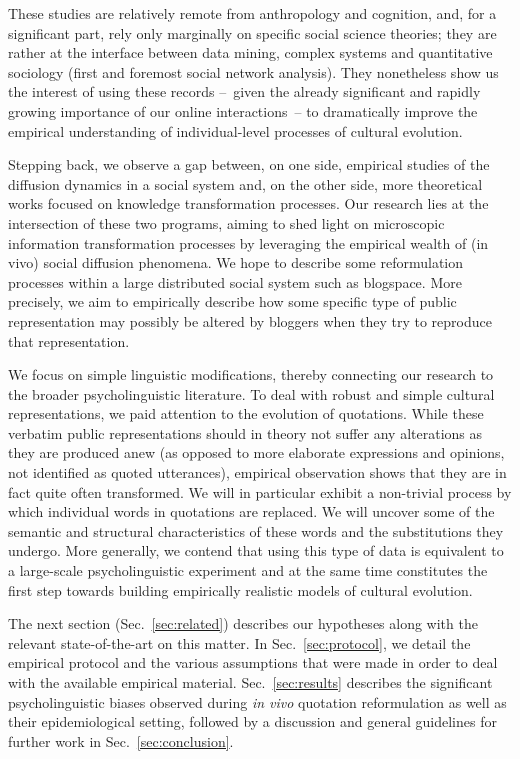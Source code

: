 These studies are relatively remote from anthropology and cognition, and, for a significant part, rely only marginally on specific social science theories; they are rather at the interface between data mining, complex systems and quantitative sociology (first and foremost social network analysis). They nonetheless show us the interest of using these records --~given the already significant and rapidly growing importance of our online interactions~--
to dramatically improve the empirical understanding of individual-level processes of cultural evolution.


\bigskip
Stepping back, we observe a gap between, on one side, empirical studies of the diffusion dynamics in a social system and, on the other side, more theoretical works  focused on knowledge transformation processes. %
Our research lies at the intersection of these two programs, aiming to shed light on microscopic information transformation processes by leveraging the empirical wealth of (in vivo) social diffusion phenomena.   We hope to describe some reformulation processes within a large distributed social system such as blogspace. More precisely, we aim to empirically describe how some specific type of public representation may possibly be altered by bloggers when they try to reproduce that representation. 

We focus on simple linguistic modifications, thereby connecting our research to the broader psycholinguistic literature.
To deal with robust and simple cultural representations, we paid attention to the evolution of quotations.
While these verbatim public representations should in theory not suffer any alterations as they are produced anew (as opposed to more elaborate expressions and opinions, not identified as quoted utterances), empirical observation shows that they are in fact quite often transformed.
We will in particular exhibit a non-trivial process by which individual words in quotations are replaced.
We will uncover some of the semantic and structural characteristics of these words and the substitutions they undergo.
More generally, we contend that using this type of data is equivalent to a large-scale psycholinguistic experiment and at the same time constitutes the first step towards building empirically realistic models of cultural evolution.

The next section (Sec.~\ref{sec:related}) describes our hypotheses along with the relevant state-of-the-art on this  matter.
In Sec.~\ref{sec:protocol}, we detail the empirical protocol and the various assumptions that were made in order to deal with the available empirical material.
Sec.~\ref{sec:results} describes the significant psycholinguistic biases observed during \emph{in vivo} quotation reformulation as well as their epidemiological setting, followed by a discussion and general guidelines for further work in Sec.~\ref{sec:conclusion}.

